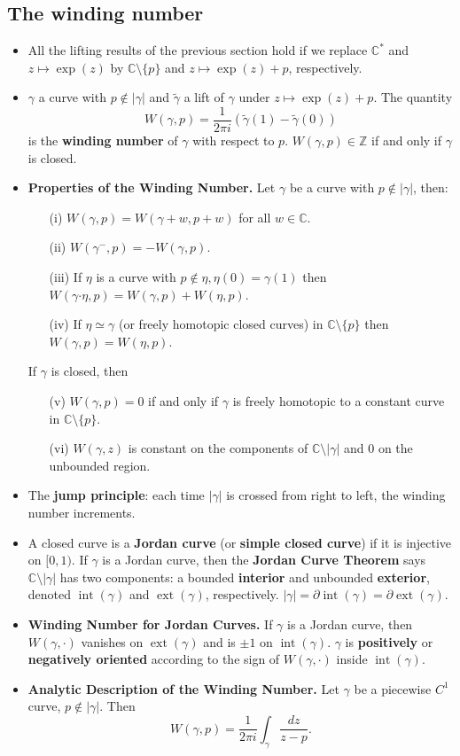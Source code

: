 \documentclass{article}
\DeclareMathOperator{\interior}{int}
\DeclareMathOperator{\exterior}{ext}
\newenvironment{topic}[1]{%
{\subsection{#1}}%
\begin{itemize}%
}{%
\end{itemize}%
}
\newcommand{\theorem}[1]{\item {\bf #1.}}
\newcommand{\term}[1]{{\bf #1}}
\newcommand{\remark}{\item}
\newcommand{\curveproduct}{\boldsymbol{\cdot}}
\begin{document}
\begin{topic}{The winding number}

\remark All the lifting results of the previous section hold if we replace $\mathbb{C}^\ast$ and $z \mapsto \exp(z)$ by $\mathbb{C} \setminus \{p\}$ and $z \mapsto \exp(z) + p$, respectively.

\remark $\gamma$ a curve with $p \not\in |\gamma|$ and $\tilde{\gamma}$ a lift of $\gamma$ under $z \mapsto \exp(z) + p$. The quantity $$W(\gamma, p) = \dfrac{1}{2 \pi i}\left(\tilde{\gamma}(1) - \tilde{\gamma}(0)\right)$$ is the \term{winding number} of $\gamma$ with respect to $p$. $W(\gamma, p) \in \mathbb{Z}$ if and only if $\gamma$ is closed.

\theorem{Properties of the Winding Number} Let $\gamma$ be a curve with $p \not\in |\gamma|$, then:
\begin{enumerate}
\item[(i)] $W(\gamma, p) = W(\gamma + w, p + w)$ for all $w \in \mathbb{C}$.
\item[(ii)] $W(\gamma^-, p) = -W(\gamma, p)$.
\item[(iii)] If $\eta$ is a curve with $p \not\in \eta, \eta(0) = \gamma(1)$ then $W(\gamma \curveproduct \eta, p) = W(\gamma, p) + W(\eta, p)$.
\item[(iv)] If $\eta \simeq \gamma$ (or freely homotopic closed curves) in $\mathbb{C} \setminus \{ p \}$ then $W(\gamma, p) = W(\eta, p)$.
\end{enumerate}
If $\gamma$ is closed, then
\begin{enumerate}
\item[(v)] $W(\gamma, p) = 0$ if and only if $\gamma$ is freely homotopic to a constant curve in $\mathbb{C} \setminus \{ p \}$.
\item[(vi)] $W(\gamma, z)$ is constant on the components of $\mathbb{C} \setminus |\gamma|$ and $0$ on the unbounded region.
\end{enumerate}

\remark The \term{jump principle}: each time $|\gamma|$ is crossed from right to left, the winding number increments.

\remark A closed curve is a \term{Jordan curve} (or \term{simple closed curve}) if it is injective on $[0, 1)$. If $\gamma$ is a Jordan curve, then the \term{Jordan Curve Theorem} says $\mathbb{C} \setminus |\gamma|$ has two components: a bounded \term{interior} and unbounded \term{exterior}, denoted $\interior(\gamma)$ and $\exterior(\gamma)$, respectively. $|\gamma| = \partial \interior(\gamma) = \partial \exterior(\gamma)$.

\theorem{Winding Number for Jordan Curves} If $\gamma$ is a Jordan curve, then $W(\gamma, \cdot)$ vanishes on $\exterior(\gamma)$ and is $\pm 1$ on $\interior(\gamma)$. $\gamma$ is \term{positively} or \term{negatively oriented} according to the sign of $W(\gamma, \cdot)$ inside $\interior(\gamma)$.

\theorem{Analytic Description of the Winding Number} Let $\gamma$ be a piecewise $C^1$ curve, $p \not\in |\gamma|$. Then $$W(\gamma, p) = \dfrac{1}{2 \pi i} \int_{\gamma} \dfrac{dz}{z - p}.$$

\end{topic}
\end{document}
